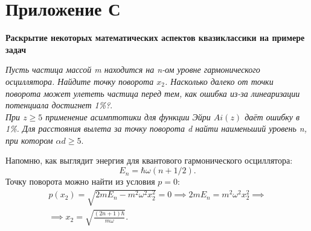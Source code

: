 \section{Приложение С}\label{appendix:C}
\begin{center}
  \textbf{\Large{Раскрытие некоторых математических аспектов квазиклассики на
      примере задач}}
\end{center}

\begin{exercise}
  \textit{Пусть частица массой m находится на n-ом уровне гармонического
    осциллятора. Найдите точку поворота $x_2$. Насколько далеко от точки поворота
    может улететь частица перед тем, как ошибка из-за линеаризации потенциала
    достигнет 1\%?}.\\ \textit{При $z\geq 5$ применение асимптотики для функции
    Эйри $Ai(z)$ даёт ошибку в 1\%. Для расстояния вылета за точку поворота d найти
    наименьший уровень n, при котором $\alpha d\geq 5$}.
\end{exercise}

Напомню, как выглядит энергия для квантового гармонического осциллятора:
\[E_n = \hbar\omega(n + 1/2).\]
Точку поворота можно найти из условия $p = 0$:
\begin{gather*}
  p(x_2) = \sqrt{2mE_n - m^2\omega^2x_2^2} = 0 \implies 2mE_n = m^2\omega^2x_2^2 \implies \\
  \implies x_2 = \sqrt{\frac{(2n + 1)\hbar}{m\omega}}.
\end{gather*}

